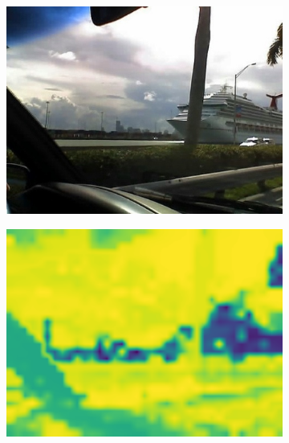 \begin{figure}[t]
\centering
\begin{subfigure}{0.3\textwidth}
    \centering
    \includegraphics[width=\linewidth]{figures/experiments/entropymaps/finetuned/13/0013.jpg}
\end{subfigure}
\begin{subfigure}{0.3\textwidth}
    \centering
    \includegraphics[width=\linewidth]{figures/experiments/entropymaps/finetuned/13/class_entropywithoutcb.pdf}
\end{subfigure}
\begin{subfigure}{0.3\textwidth}
    \centering

\end{subfigure}
\end{figure}

